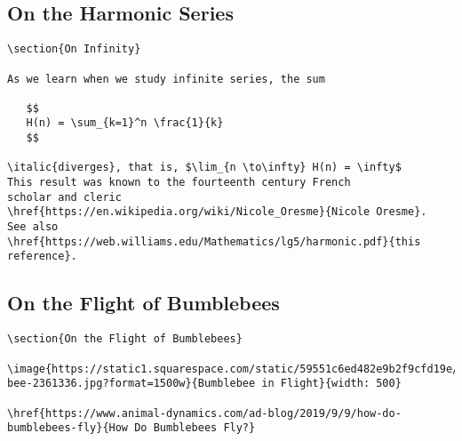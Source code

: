 \subsection{On the Harmonic Series}

\begin{verbatim}
\section{On Infinity}

As we learn when we study infinite series, the sum

   $$
   H(n) = \sum_{k=1}^n \frac{1}{k}
   $$

\italic{diverges}, that is, $\lim_{n \to\infty} H(n) = \infty$ 
This result was known to the fourteenth century French 
scholar and cleric 
\href{https://en.wikipedia.org/wiki/Nicole_Oresme}{Nicole Oresme}. 
See also 
\href{https://web.williams.edu/Mathematics/lg5/harmonic.pdf}{this reference}.
\end{verbatim}

\subsection{On the Flight of Bumblebees}

\begin{verbatim}
\section{On the Flight of Bumblebees}

\image{https://static1.squarespace.com/static/59551c6ed482e9b2f9cfd19e/5c7520c14e17b619cc5dfbc6/5d766e02ae60d6301a5525e4/1568109389031/bumble-bee-2361336.jpg?format=1500w}{Bumblebee in Flight}{width: 500}

\href{https://www.animal-dynamics.com/ad-blog/2019/9/9/how-do-bumblebees-fly}{How Do Bumblebees Fly?}


\end{verbatim}


